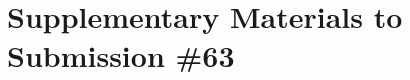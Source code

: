 \documentclass[10pt,conference]{IEEEtran}
\begin{document}
\IEEEpeerreviewmaketitle
{}
\pagestyle{plain}










\newpage




\newpage
\clearpage
\setcounter{section}{0}
\section*{Supplementary Materials to Submission \#63}
\setcounter{page}{1}

\end{document}
